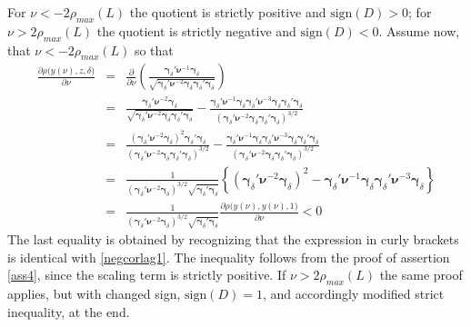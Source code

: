 \documentclass[a4paper]{article}
\begin{document}
For $\nu<-2\rho_{max}(L)$ the quotient is strictly positive and $\textrm{sign}(D)>0$; for $\nu>2\rho_{max}(L)$ the quotient is strictly negative and $\textrm{sign}(D)<0$. Assume now, that $\nu<-2\rho_{max}(L)$ so that
\begin{eqnarray*}
\frac{\partial\rho\Big(y(\nu),z,\delta\Big)}{\partial\nu}&=&\frac{\partial}{\partial\nu}\left(\frac{\boldsymbol{\gamma}_{\delta}'\boldsymbol{\nu}^{-1}\boldsymbol{\gamma}_{\delta}}{\sqrt{\boldsymbol{\gamma}_{\delta}'\boldsymbol{\nu}^{-2}\boldsymbol{\gamma}_{\delta}\boldsymbol{\gamma}_{\delta}'\boldsymbol{\gamma}_{\delta}}}\right)\\
&=&\frac{\boldsymbol{\gamma}_{\delta}'\boldsymbol{\nu}^{-2}\boldsymbol{\gamma}_{\delta}}{\sqrt{\boldsymbol{\gamma}_{\delta}'\boldsymbol{\nu}^{-2}\boldsymbol{\gamma}_{\delta}\boldsymbol{\gamma}_{\delta}'\boldsymbol{\gamma}_{\delta}}}-\frac{\boldsymbol{\gamma}_{\delta}'\boldsymbol{\nu}^{-1}\boldsymbol{\gamma}_{\delta}\boldsymbol{\gamma}_{\delta}'\boldsymbol{\nu}^{-3}\boldsymbol{\gamma}_{\delta}\boldsymbol{\gamma}_{\delta}'\boldsymbol{\gamma}_{\delta}}{\left(\boldsymbol{\gamma}_{\delta}'\boldsymbol{\nu}^{-2}\boldsymbol{\gamma}_{\delta}\boldsymbol{\gamma}_{\delta}'\boldsymbol{\gamma}_{\delta}\right)^{3/2}}\\
&=&\frac{\left(\boldsymbol{\gamma}_{\delta}'\boldsymbol{\nu}^{-2}\boldsymbol{\gamma}_{\delta}\right)^2\boldsymbol{\gamma}_{\delta}'\boldsymbol{\gamma}_{\delta}
}{\left(\boldsymbol{\gamma}_{\delta}'\boldsymbol{\nu}^{-2}\boldsymbol{\gamma}_{\delta}\boldsymbol{\gamma}_{\delta}'\boldsymbol{\gamma}_{\delta}\right)^{3/2}}-\frac{\boldsymbol{\gamma}_{\delta}'\boldsymbol{\nu}^{-1}\boldsymbol{\gamma}_{\delta}\boldsymbol{\gamma}_{\delta}'\boldsymbol{\nu}^{-3}\boldsymbol{\gamma}_{\delta}\boldsymbol{\gamma}_{\delta}'\boldsymbol{\gamma}_{\delta}}{\left(\boldsymbol{\gamma}_{\delta}'\boldsymbol{\nu}^{-2}\boldsymbol{\gamma}_{\delta}\boldsymbol{\gamma}_{\delta}'\boldsymbol{\gamma}_{\delta}\right)^{3/2}}\\
&=&\frac{1}{\left(\boldsymbol{\gamma}_{\delta}'\boldsymbol{\nu}^{-2}\boldsymbol{\gamma}_{\delta}\right)^{3/2}\sqrt{\boldsymbol{\gamma}_{\delta}'\boldsymbol{\gamma}_{\delta}}} \left\{\left(\boldsymbol{\gamma}_{\delta}'\boldsymbol{\nu}^{-2}\boldsymbol{\gamma}_{\delta}\right)^2-\boldsymbol{\gamma}_{\delta}'\boldsymbol{\nu}^{-1}\boldsymbol{\gamma}_{\delta}\boldsymbol{\gamma}_{\delta}'\boldsymbol{\nu}^{-3}\boldsymbol{\gamma}_{\delta}\right\}\\
&=&\frac{1}{\left(\boldsymbol{\gamma}_{\delta}'\boldsymbol{\nu}^{-2}\boldsymbol{\gamma}_{\delta}\right)^{3/2}\sqrt{\boldsymbol{\gamma}_{\delta}'\boldsymbol{\gamma}_{\delta}}}\frac{\partial\rho\Big(y(\nu),y(\nu),1\Big)}{\partial\nu}<0
\end{eqnarray*}
The last equality is obtained by recognizing that the expression in curly brackets is identical with \ref{negcorlag1}. The inequality follows from the proof of assertion \ref{ass4}, since the scaling term is strictly positive. If $\nu>2\rho_{max}(L)$ the same proof applies, but with changed sign, $\textrm{sign}(D)=1$, and accordingly modified strict inequality, at the end. \\
\end{document}
